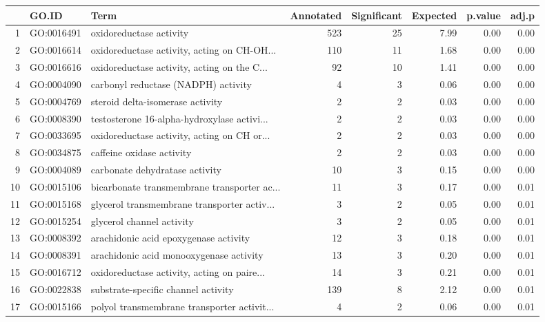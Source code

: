 \begin{table}[ht]
\centering
\begin{tabular}{rllrrrrr}
  \hline
 & GO.ID & Term & Annotated & Significant & Expected & p.value & adj.p \\ 
  \hline
1 & GO:0016491 & oxidoreductase activity & 523 &  25 & 7.99 & 0.00 & 0.00 \\ 
  2 & GO:0016614 & oxidoreductase activity, acting on CH-OH... & 110 &  11 & 1.68 & 0.00 & 0.00 \\ 
  3 & GO:0016616 & oxidoreductase activity, acting on the C... &  92 &  10 & 1.41 & 0.00 & 0.00 \\ 
  4 & GO:0004090 & carbonyl reductase (NADPH) activity &   4 &   3 & 0.06 & 0.00 & 0.00 \\ 
  5 & GO:0004769 & steroid delta-isomerase activity &   2 &   2 & 0.03 & 0.00 & 0.00 \\ 
  6 & GO:0008390 & testosterone 16-alpha-hydroxylase activi... &   2 &   2 & 0.03 & 0.00 & 0.00 \\ 
  7 & GO:0033695 & oxidoreductase activity, acting on CH or... &   2 &   2 & 0.03 & 0.00 & 0.00 \\ 
  8 & GO:0034875 & caffeine oxidase activity &   2 &   2 & 0.03 & 0.00 & 0.00 \\ 
  9 & GO:0004089 & carbonate dehydratase activity &  10 &   3 & 0.15 & 0.00 & 0.00 \\ 
  10 & GO:0015106 & bicarbonate transmembrane transporter ac... &  11 &   3 & 0.17 & 0.00 & 0.01 \\ 
  11 & GO:0015168 & glycerol transmembrane transporter activ... &   3 &   2 & 0.05 & 0.00 & 0.01 \\ 
  12 & GO:0015254 & glycerol channel activity &   3 &   2 & 0.05 & 0.00 & 0.01 \\ 
  13 & GO:0008392 & arachidonic acid epoxygenase activity &  12 &   3 & 0.18 & 0.00 & 0.01 \\ 
  14 & GO:0008391 & arachidonic acid monooxygenase activity &  13 &   3 & 0.20 & 0.00 & 0.01 \\ 
  15 & GO:0016712 & oxidoreductase activity, acting on paire... &  14 &   3 & 0.21 & 0.00 & 0.01 \\ 
  16 & GO:0022838 & substrate-specific channel activity & 139 &   8 & 2.12 & 0.00 & 0.01 \\ 
  17 & GO:0015166 & polyol transmembrane transporter activit... &   4 &   2 & 0.06 & 0.00 & 0.01 \\ 

\end{tabular}
\end{table}
